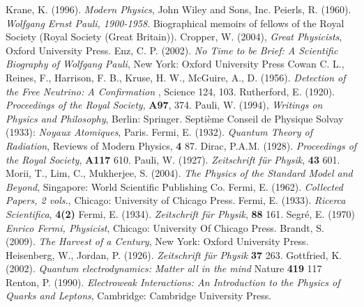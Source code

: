 \documentclass[12pt]{book}
\begin{document}
\begin{thebibliography}{widest-label}
       Krane, K. (1996). \emph{Modern Physics}, John Wiley and Sons, Inc.
      Peierls, R. (1960). \emph{Wolfgang Ernst Pauli, 1900-1958}. Biographical memoirs of fellows of the Royal Society (Royal Society (Great Britain)).
      Cropper, W. (2004), \emph{Great Physicists}, Oxford University Press.
      Enz, C. P. (2002). \emph{No Time to be Brief: A Scientific Biography of Wolfgang Pauli}, New York: Oxford University Press
      Cowan C. L., Reines, F., Harrison, F. B., Kruse, H. W., McGuire, A., D. (1956). \emph{Detection of the Free Neutrino: A Confirmation }, Science 124, 103. 
      Rutherford, E. (1920). \emph{Proceedings of the Royal Society}, \textbf{A97}, 374.
      Pauli, W. (1994), \emph{Writings on Physics and Philosophy}, Berlin: Springer.
      Septi\`{e}me Conseil de Physique Solvay (1933): \emph{Noyaux Atomiques}, Paris.
      Fermi, E. (1932). \emph{Quantum Theory of Radiation}, Reviews of Modern Physics, \textbf{4} 87.
      Dirac, P.A.M. (1928). \emph{Proceedings of the Royal Society}, \textbf{A117} 610.
      Pauli, W. (1927). \emph{Zeitschrift f\"{u}r Physik}, \textbf{43} 601.
      Morii, T., Lim, C., Mukherjee, S. (2004). \emph{The Physics of the Standard Model and Beyond}, Singapore: World Scientific Publishing Co.
      Fermi, E. (1962). \emph{Collected Papers, 2 vols.}, Chicago: University of Chicago Press.
      Fermi, E. (1933). \emph{Ricerca Scientifica}, \textbf{4(2)}
      Fermi, E. (1934). \emph{Zeitschrift f\"{u}r Physik}, \textbf{88} 161.
      Segr\'{e}, E. (1970) \emph{Enrico Fermi, Physicist}, Chicago: University Of Chicago Press.
      Brandt, S. (2009). \emph{The Harvest of a Century}, New York: Oxford University Press.
      Heisenberg, W., Jordan, P. (1926). \emph{Zeitschrift f\"{u}r Physik} \textbf{37} 263.
      Gottfried, K. (2002). \emph{Quantum electrodynamics: Matter all in the mind} Nature \textbf{419} 117
       Renton, P. (1990). \emph{Electroweak Interactions: An Introduction to the Physics of Quarks and Leptons}, Cambridge: Cambridge University Press.


\end{thebibliography}
\end{document}

